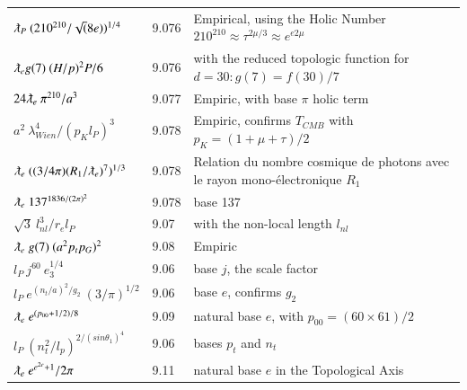 \documentclass[a4paper,9pt]{article}
\begin{document}
\begin{table}
\begin{tabular}{lll}
   
   $  \lambdabar_P ~ (210^{210}/\sqrt(8e))^{1/4}$  & 9.076 & Empirical, using the Holic Number $210^{210}\approx \tau^{2\mu/3}\approx e^{e2\mu}$  \\
   
    
   $ \lambdabar_eg(7)~ (H/p)^2  P/6 $ & 9.076 & with the reduced topologic function for $d = 30: g(7) = f(30)/7$ \cite{Sanchez2}  \\
   
    
    $ 24 \lambdabar_e ~ \pi^{210}/a^3 $ & 9.077 & Empiric, with base $\pi$ holic term \\
    
    $ a^2 ~\lambda_{Wien}^4/(p_Kl_P)^3 $ & 9.078 & Empiric, confirms $T_{CMB}$ with $p_K = (1+\mu +\tau)/2$ \cite{Koide} \\

    
     $  \lambdabar_e ~  ((3/4\pi)(R_1/\lambdabar_e)^7)^{1/3}   $ & 9.078 & Relation du nombre cosmique de photons avec le rayon mono-électronique $R_1$  \\
     
     
     $  \lambdabar_e ~ 137^{1836/(2\pi)^2}   $ & 9.078 & base 137\\
     
     
  
  $ \sqrt 3~l_{nl}^3/r_el_P $ & 9.07 & with the non-local length $l_{nl}$  \\
  
  $ \lambdabar_e~ g(7) ~(a^2p_tp_G)^2 $ & 9.08 & Empiric \cite{Sanchez2}  \\
  
  
   $ l_P ~j^{60}~ e_3^{1/4} $ & 9.06 & base $j$, the scale factor  \\
   
   
   
   $ l_P ~e^{(n_t/a)^2/g_2}~(3/\pi)^{1/2} $ & 9.06 & base $e$, confirms $g_2$  \\
  
  
  
  
  $ \lambdabar_e ~e^{(p_{00}+1/2)/8} $ & 9.09 & natural base $e$, with $p_{00} = (60 \times 61)/2$ \\
  
  
  
  
  $ l_P ~(n_t^2/l_p)^{2/(sin\theta_1)^4} $ & 9.06 & bases $p_t$ and $n_t$ \\
  
  
  
  $ \lambdabar_e ~e^{e^{2e}+1}/2\pi $ & 9.11 & natural base $e$ in the Topological Axis\\
  

\end{tabular}
\end{table}
\end{document}
